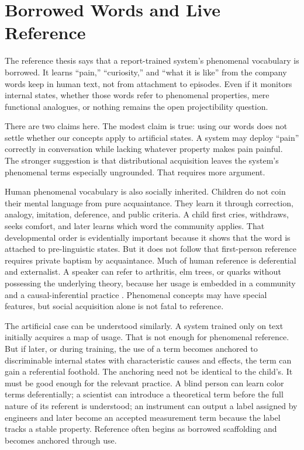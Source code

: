 \documentclass[11pt]{article}
\begin{document}
\section{Borrowed Words and Live Reference}

The reference thesis says that a report-trained system's phenomenal vocabulary is borrowed. It learns ``pain,'' ``curiosity,'' and ``what it is like'' from the company words keep in human text, not from attachment to episodes. Even if it monitors internal states, whether those words refer to phenomenal properties, mere functional analogues, or nothing remains the open projectibility question.

There are two claims here. The modest claim is true: using our words does not settle whether our concepts apply to artificial states. A system may deploy ``pain'' correctly in conversation while lacking whatever property makes pain painful. The stronger suggestion is that distributional acquisition leaves the system's phenomenal terms especially ungrounded. That requires more argument.

Human phenomenal vocabulary is also socially inherited. Children do not coin their mental language from pure acquaintance. They learn it through correction, analogy, imitation, deference, and public criteria. A child first cries, withdraws, seeks comfort, and later learns which word the community applies. That developmental order is evidentially important because it shows that the word is attached to pre-linguistic states. But it does not follow that first-person reference requires private baptism by acquaintance. Much of human reference is deferential and externalist. A speaker can refer to arthritis, elm trees, or quarks without possessing the underlying theory, because her usage is embedded in a community and a causal-inferential practice \citep{putnam1975,burge1979}. Phenomenal concepts may have special features, but social acquisition alone is not fatal to reference.

The artificial case can be understood similarly. A system trained only on text initially acquires a map of usage. That is not enough for phenomenal reference. But if later, or during training, the use of a term becomes anchored to discriminable internal states with characteristic causes and effects, the term can gain a referential foothold. The anchoring need not be identical to the child's. It must be good enough for the relevant practice. A blind person can learn color terms deferentially; a scientist can introduce a theoretical term before the full nature of its referent is understood; an instrument can output a label assigned by engineers and later become an accepted measurement term because the label tracks a stable property. Reference often begins as borrowed scaffolding and becomes anchored through use.
\end{document}
